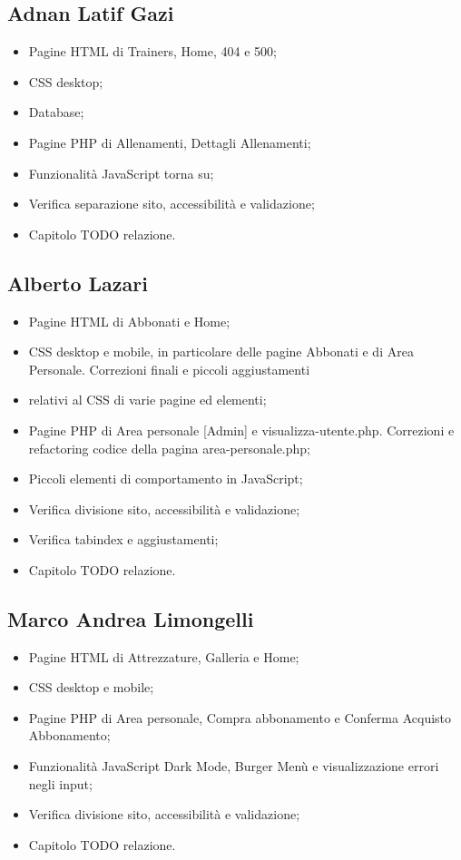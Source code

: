 \documentclass[a4paper]{article}
\begin{document}
    \subsection{Adnan Latif Gazi}
    \begin{itemize}
        \item Pagine HTML di Trainers, Home, 404 e 500;
        \item CSS desktop;
        \item Database;
        \item Pagine PHP di Allenamenti, Dettagli Allenamenti;
        \item Funzionalità JavaScript torna su;
        \item Verifica separazione sito, accessibilità e validazione;
        \item Capitolo TODO relazione.        
    \end{itemize}

    \subsection{Alberto Lazari}
    \begin{itemize}
        \item Pagine HTML di Abbonati e Home;
        \item CSS desktop e mobile, in particolare delle pagine Abbonati e di Area Personale. Correzioni finali e piccoli aggiustamenti \item relativi al CSS di varie pagine ed elementi;
        \item Pagine PHP di Area personale [Admin] e visualizza-utente.php. Correzioni e refactoring codice della pagina area-personale.php;
        \item Piccoli elementi di comportamento in JavaScript;
        \item Verifica divisione sito, accessibilità e validazione;
        \item Verifica tabindex e aggiustamenti;
        \item Capitolo TODO relazione.        
    \end{itemize}

    \subsection{Marco Andrea Limongelli}
    \begin{itemize}
        \item Pagine HTML di Attrezzature, Galleria e Home;
        \item CSS desktop e mobile;
        \item Pagine PHP di Area personale, Compra abbonamento e Conferma Acquisto Abbonamento;
        \item Funzionalità JavaScript Dark Mode, Burger Menù e visualizzazione errori negli input;
        \item Verifica divisione sito, accessibilità e validazione;
        \item Capitolo TODO relazione.        
    \end{itemize}
\end{document}
